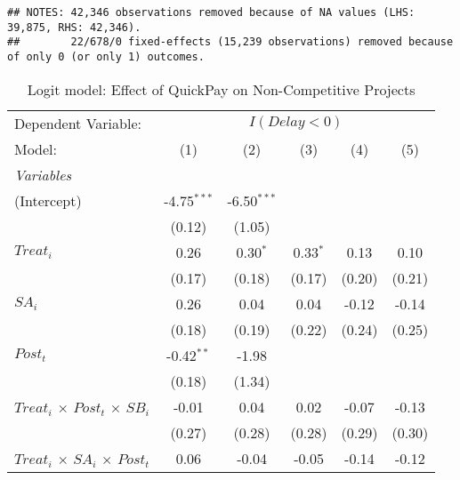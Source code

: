 \documentclass[
]{article}
\begin{document}
\begin{verbatim}
## NOTES: 42,346 observations removed because of NA values (LHS: 39,875, RHS: 42,346).
##        22/678/0 fixed-effects (15,239 observations) removed because of only 0 (or only 1) outcomes.
\end{verbatim}

\begin{table}[htbp]
   \centering
   \caption{Logit model: Effect of QuickPay on Non-Competitive Projects}
   \begin{tabular}{lccccc}
      \tabularnewline\midrule\midrule
      Dependent Variable: & \multicolumn{5}{c}{$I(Delay<0)$}\\
      Model:                                        & (1)           & (2)           & (3)        & (4)     & (5)\\
      \midrule \emph{Variables} &   &   &   &   &  \\
      (Intercept)                                   & -4.75$^{***}$ & -6.50$^{***}$ &            &         &   \\
                                                    & (0.12)        & (1.05)        &            &         &   \\
      $Treat_i$                                     & 0.26          & 0.30$^{*}$    & 0.33$^{*}$ & 0.13    & 0.10\\
                                                    & (0.17)        & (0.18)        & (0.17)     & (0.20)  & (0.21)\\
      $SA_i$                                        & 0.26          & 0.04          & 0.04       & -0.12   & -0.14\\
                                                    & (0.18)        & (0.19)        & (0.22)     & (0.24)  & (0.25)\\
      $Post_t$                                      & -0.42$^{**}$  & -1.98         &            &         &   \\
                                                    & (0.18)        & (1.34)        &            &         &   \\
      $Treat_i$ $\times$ $Post_t$ $\times$ $SB_i$ & -0.01         & 0.04          & 0.02       & -0.07   & -0.13\\
                                                    & (0.27)        & (0.28)        & (0.28)     & (0.29)  & (0.30)\\
      $Treat_i$ $\times$ $SA_i$ $\times$ $Post_t$ & 0.06          & -0.04         & -0.05      & -0.14   & -0.12\\

\end{tabular}
\end{table}
\end{document}
